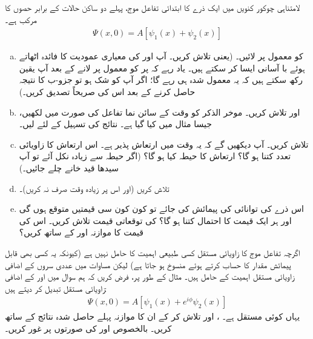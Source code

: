 لامتناہی چوکور کنویں  میں ایک ذرے کا ابتدائی تفاعل موج،   پہلے  دو ساکن  حالات  کے برابر  حصوں کا مرکب ہے۔ 
\begin{align*}
\Psi(x,0) = A[\psi_{1}(x) + \psi_{2}(x)]
\end{align*}
\begin{enumerate}[a.]
\item 
{} کو معمول پر لائیں۔ (یعنی  تلاش کریں۔ آپ  اور  کی معیاری عمودیت  کا فائدہ اٹھاتے  ہوئے با آسانی ایسا کر سکتے ہیں۔ یاد رہے کہ  پر  کو معمول پر لانے کے بعد آپ یقین رکھ سکتے ہیں کہ یہ معمول شدہ ہی رہے گا؛  اگر آپ کو شک ہو تو  جزو-ب کا نتیجہ حاصل کرنے کے بعد اس کی صریحاً تصدیق کریں۔) 
\item
{} اور  تلاش کریں۔ موخر الذکر کو وقت کے سائن نما تفاعل کی صورت میں لکھیں، جیسا مثال  میں کیا گیا ہے۔ نتائج کی  تسہیل  کے لئے   لیں۔ 
\item 
{} تلاش کریں۔ آپ دیکھیں گے کہ یہ وقت میں  ارتعاش  پذیر  ہے۔ اس ارتعاش کا  زاویائی تعدد کتنا ہو گا؟ ارتعاش کا حیطہ کیا ہو گا؟ (اگر  حیطہ  سے زیادہ نکل آئے تو  آپ  سیدھا    قید خانے  چلے جائیں۔) 
\item 
{} تلاش کریں (اور اس پر  زیادہ وقت صرف نہ کریں)۔ 
\item
اس ذرے کی توانائی کی پیمائش کی جائے  تو  کون کون سی قیمتیں متوقع ہوں گی اور ہر ایک قیمت کا احتمال کتنا ہو گا؟  کی توقعاتی قیمت تلاش کریں۔ اس کی قیمت کا موازنہ  اور  کے ساتھ کریں؟
\end{enumerate}
اگرچہ تفاعل موج کا   زاویائی مستقل کسی  طبیعی اہمیت کا حامل نہیں ہے (کیونکہ یہ کسی بھی قابل پیمائش مقدار کا حساب کرتے ہوئے منسوخ ہو جاتا ہے) لیکن مساوات  میں عددی سروں کے اضافی زاویائی مستقل اہمیت کے حامل ہیں۔ مثال کے طور پر، فرض کریں کہ  ہم سوال  میں  اور  کے اضافی زاویائی مستقل تبدیل کر دیتے  ہیں:
\begin{align*}
\Psi (x,0) = A[\psi_{1} (x) + e^{i\phi}\psi_{2}(x)]
\end{align*}
یہاں  کوئی مستقل ہے۔ ،  اور  تلاش کر کے ان کا موازنہ پہلے حاصل شدہ نتائج کے ساتھ کریں۔ بالخصوص  اور  کی صورتوں پر غور کریں۔ 
